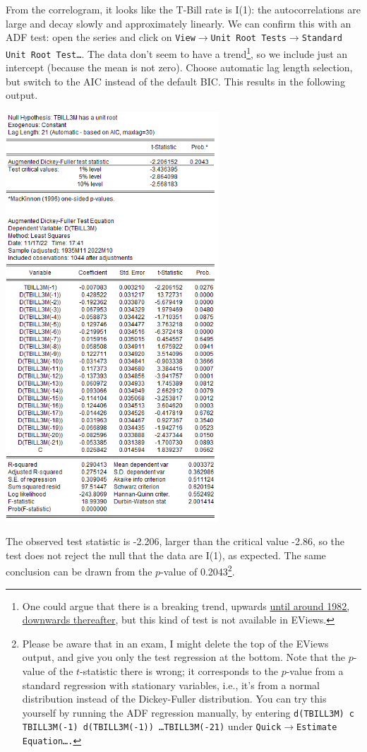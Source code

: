 \documentclass[11pt, a4paper]{article}
\begin{document}
\begin{enumerate}
\begin{enumerate}
\begin{center}
\end{center}
From the correlogram, it looks like the T-Bill rate is I(1): the autocorrelations are large and decay slowly and approximately linearly. We can confirm this with an ADF test: open the series and click on \texttt{View$\rightarrow$Unit Root Tests$\rightarrow$Standard Unit Root Test\ldots}. The data don't seem to have a trend\footnote{One could argue that there is a breaking trend, upwards \href{https://www.statista.com/statistics/1338105/volcker-shock-interest-rates-unemployment-inflation/}{until around 1982, downwards thereafter}, but this kind of test is not available in EViews.}, so we include just an intercept (because the mean is not zero). Choose automatic lag length selection, but switch to the AIC instead of the default BIC. This results in the following output.
\begin{center}
\includegraphics[width=0.6\textwidth]{tbilladf}
\end{center}
The observed test statistic is -2.206, larger than the critical value -2.86, so the test does not reject the null that the data are I(1), as expected. The same conclusion can be drawn from the $p$-value of 0.2043\footnote{Please be aware that in an exam, I might delete the top of the EViews output, and give you only the test regression at the bottom. Note that the $p$-value of the $t$-statistic there is wrong; it corresponds to the $p$-value from a standard regression with stationary variables, i.e., it's from a normal distribution instead of the Dickey-Fuller distribution. You can try this yourself by running the ADF regression manually, by entering \texttt{d(TBILL3M) c TBILL3M(-1) d(TBILL3M(-1)) \ldots TBILL3M(-21)} under \texttt{Quick$\rightarrow$Estimate Equation\ldots.}}.

\end{enumerate}
\end{enumerate}
\end{document}
